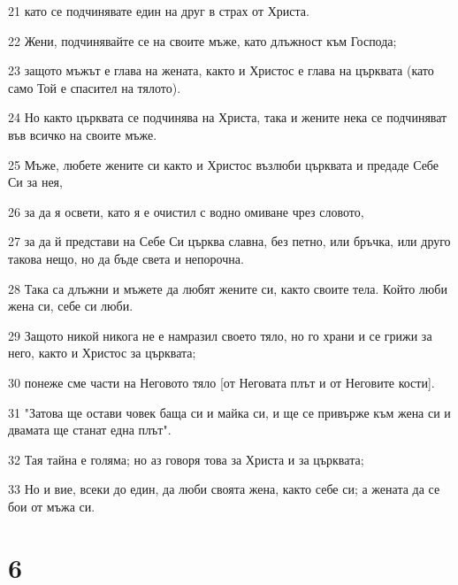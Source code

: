 \par 21 като се подчинявате един на друг в страх от Христа.
\par 22 Жени, подчинявайте се на своите мъже, като длъжност към Господа;
\par 23 защото мъжът е глава на жената, както и Христос е глава на църквата (като само Той е спасител на тялото).
\par 24 Но както църквата се подчинява на Христа, така и жените нека се подчиняват във всичко на своите мъже.
\par 25 Мъже, любете жените си както и Христос възлюби църквата и предаде Себе Си за нея,
\par 26 за да я освети, като я е очистил с водно омиване чрез словото,
\par 27 за да й представи на Себе Си църква славна, без петно, или бръчка, или друго такова нещо, но да бъде света и непорочна.
\par 28 Така са длъжни и мъжете да любят жените си, както своите тела. Който люби жена си, себе си люби.
\par 29 Защото никой никога не е намразил своето тяло, но го храни и се грижи за него, както и Христос за църквата;
\par 30 понеже сме части на Неговото тяло [от Неговата плът и от Неговите кости].
\par 31 "Затова ще остави човек баща си и майка си, и ще се привърже към жена си и двамата ще станат една плът".
\par 32 Тая тайна е голяма; но аз говоря това за Христа и за църквата;
\par 33 Но и вие, всеки до един, да люби своята жена, както себе си; а жената да се бои от мъжа си.

\chapter{6}

